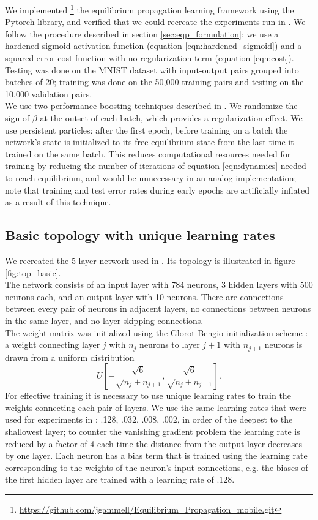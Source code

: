 \documentclass[format=sigconf]{acmart}
\newcommand{\npar}{\\\indent}
\begin{document}
We implemented
\footnote{\url{https://github.com/jgammell/Equilibrium_Propagation_mobile.git}}
 the equilibrium propagation learning framework \cite{scellier17} using the Pytorch library, and verified that we could recreate the experiments run in \cite{scellier17}. We follow the procedure described in section \ref{sec:eqp_formulation}; we use a hardened sigmoid activation function (equation \ref{eqn:hardened_sigmoid}) and a squared-error cost function with no regularization term (equation \ref{eqn:cost}). Testing was done on the MNIST dataset \cite{mnist1998} with input-output pairs grouped into batches of 20; training was done on the 50,000 training pairs and testing on the 10,000 validation pairs.
\npar
We use two performance-boosting techniques described in \cite{scellier17}. We randomize the sign of $\beta$ at the outset of each batch, which provides a regularization effect. We use persistent particles: after the first epoch, before training on a batch the network's state is initialized to its free equilibrium state from the last time it trained on the same batch. This reduces computational resources needed for training by reducing the number of iterations of equation \ref{eqn:dynamics} needed to reach equilibrium, and would be unnecessary in an analog implementation; note that training and test error rates during early epochs are artificially inflated as a result of this technique.

\subsection{Basic topology with unique learning rates}
\label{sec:basic_topology}

We recreated the 5-layer network used in \cite{scellier17}. Its topology is illustrated in figure \ref{fig:top_basic}.
\npar
The network consists of an input layer with 784 neurons, 3 hidden layers with 500 neurons each, and an output layer with 10 neurons. There are connections between every pair of neurons in adjacent layers, no connections between neurons in the same layer, and no layer-skipping connections.
\npar
The weight matrix was initialized using the Glorot-Bengio initialization scheme \cite{glorot2010}: a weight connecting layer $j$ with $n_j$ neurons to layer $j+1$ with $n_{j+1}$ neurons is drawn from a uniform distribution
\begin{equation}
\label{eqn:gb_init}
U[-\frac{\sqrt{6}}{\sqrt{n_j+n_{j+1}}},\frac{\sqrt{6}}{\sqrt{n_j+n_{j+1}}}].
\end{equation}
For effective training it is necessary to use unique learning rates to train the weights connecting each pair of layers. We use the same learning rates that were used for experiments in \cite{scellier17}: .128, .032, .008, .002, in order of the deepest to the shallowest layer; to counter the vanishing gradient problem the learning rate is reduced by a factor of 4 each time the distance from the output layer decreases by one layer. Each neuron has a bias term that is trained using the learning rate corresponding to the weights of the neuron's input connections, e.g. the biases of the first hidden layer are trained with a learning rate of .128.
\end{document}
